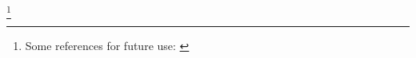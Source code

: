 \documentclass[10pt,titlepage]{book}
\begin{document}
\footnote{Some references for future use:
\cite{arthan1991formal}
\cite{beeson2012foundations}
\cite{centrone2019reflections}
\cite{dzamonja2019}
\cite{gettier1963justified}
\cite{jones1992a,jones1992b}
\cite{kline1990mathematical1}
\cite{kline1990mathematical2}
\cite{kline1990mathematical3}
\cite{kumar2016self}
\cite{oliveira2006unifying}
\cite{shapiro1991foundations}
\cite{shapiroHPML}
\cite{tarski31}
\cite{tarski56}
}

{}


\end{document}
